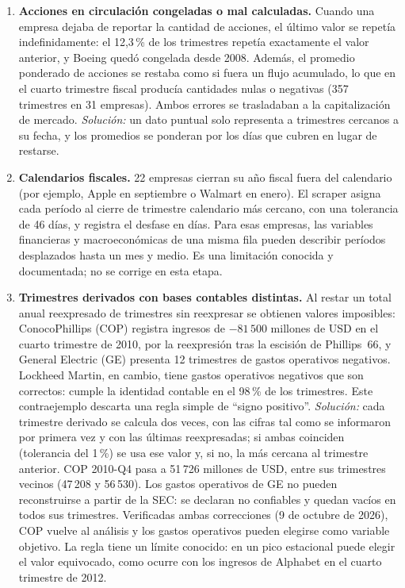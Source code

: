 \documentclass[12pt,letterpaper,oneside]{report}
\renewcommand{\_}{\UnderscoreOriginal\allowbreak}
\begin{document}
\begin{enumerate}
  \item \textbf{Acciones en circulación congeladas o mal calculadas.} Cuando una empresa dejaba de reportar la cantidad de acciones, el último valor se repetía indefinidamente: el 12,3\,\% de los trimestres repetía exactamente el valor anterior, y Boeing quedó congelada desde 2008. Además, el promedio ponderado de acciones se restaba como si fuera un flujo acumulado, lo que en el cuarto trimestre fiscal producía cantidades nulas o negativas (357 trimestres en 31 empresas). Ambos errores se trasladaban a la capitalización de mercado. \emph{Solución:} un dato puntual solo representa a trimestres cercanos a su fecha, y los promedios se ponderan por los días que cubren en lugar de restarse.
  \item \textbf{Calendarios fiscales.} 22 empresas cierran su año fiscal fuera del calendario (por ejemplo, Apple en septiembre o Walmart en enero). El scraper asigna cada período al cierre de trimestre calendario más cercano, con una tolerancia de 46 días, y registra el desfase en días. Para esas empresas, las variables financieras y macroeconómicas de una misma fila pueden describir períodos desplazados hasta un mes y medio. Es una limitación conocida y documentada; no se corrige en esta etapa.
  \item \textbf{Trimestres derivados con bases contables distintas.} Al restar un total anual reexpresado de trimestres sin reexpresar se obtienen valores imposibles: ConocoPhillips (COP) registra ingresos de $-81\,500$ millones de USD en el cuarto trimestre de 2010, por la reexpresión tras la escisión de Phillips~66, y General Electric (GE) presenta 12 trimestres de gastos operativos negativos. Lockheed Martin, en cambio, tiene gastos operativos negativos que son correctos: cumple la identidad contable en el 98\,\% de los trimestres. Este contraejemplo descarta una regla simple de ``signo positivo''. \emph{Solución:} cada trimestre derivado se calcula dos veces, con las cifras tal como se informaron por primera vez y con las últimas reexpresadas; si ambas coinciden (tolerancia del 1\,\%) se usa ese valor y, si no, la más cercana al trimestre anterior. COP 2010-Q4 pasa a 51\,726 millones de USD, entre sus trimestres vecinos (47\,208 y 56\,530). Los gastos operativos de GE no pueden reconstruirse a partir de la SEC: se declaran no confiables y quedan vacíos en todos sus trimestres. Verificadas ambas correcciones (9 de octubre de 2026), COP vuelve al análisis y los gastos operativos pueden elegirse como variable objetivo. La regla tiene un límite conocido: en un pico estacional puede elegir el valor equivocado, como ocurre con los ingresos de Alphabet en el cuarto trimestre de 2012.

\end{enumerate}
\end{document}
